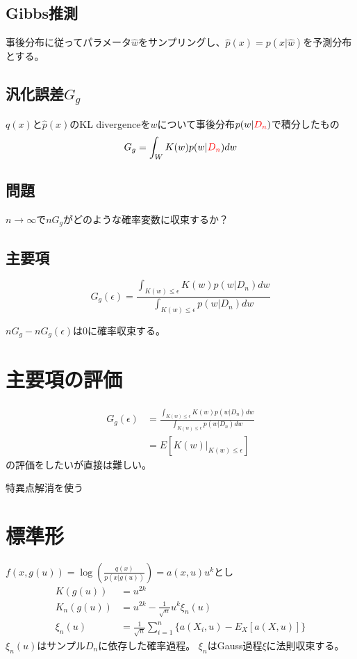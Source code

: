\documentclass[uplatex, slide, papersize]{jsarticle}
\begin{document}
\subsection*{Gibbs推測}
事後分布に従ってパラメータ$\hat{w}$をサンプリングし、$\hat{p}(x)=p(x\vert \hat{w})$を予測分布とする。
\subsection*{汎化誤差$G_g$}
$q(x)$と$\hat{p}(x)$のKL divergenceを$w$について事後分布$p(w\vert \textcolor{red}{D_n})$で積分したもの
\[
G_g=\int_WK(w)p(w\vert \textcolor{red}{D_n} )dw
\]

\newpage
\subsection*{問題}
$n\to\infty$で$nG_g$がどのような確率変数に収束するか？

\subsection*{主要項}
\[
G_g(\epsilon)=\frac{\int_{K(w)\leq\epsilon}K(w)p(w\vert D_n)dw}{\int_{K(w)\leq\epsilon}p(w\vert D_n)dw}
\]

\begin{lem}[Lemma 6.3]
$nG_g-nG_g(\epsilon)$は$0$に確率収束する。
\end{lem}

\section*{主要項の評価}
\begin{align*}
G_g(\epsilon)&=\frac{\int_{K(w)\leq\epsilon}K(w)p(w\vert D_n)dw}{\int_{K(w)\leq\epsilon}p(w\vert D_n)dw}\\
&=E[K(w)\vert_{K(w)\leq\epsilon}]
\end{align*}
の評価をしたいが直接は難しい。
\begin{center}
\large{特異点解消を使う}
\end{center}

\section*{標準形}
$f(x,g(u))=\log(\frac{q(x)}{p(x\vert g(u))})=a(x,u)u^k$とし
\begin{align*}
K(g(u))&=u^{2k}\\
K_n(g(u))&=u^{2k}-\frac{1}{\sqrt{n}}u^k\xi_n(u)\\
\xi_n(u)&=\frac{1}{\sqrt{n}}\sum_{i=1}^n\{a(X_i,u)-E_X[a(X,u)]\}
\end{align*}
$\xi_n(u)$はサンプル$D_n$に依存した確率過程。
$\xi_n$はGauss過程$\xi$に法則収束する。
\end{document}
